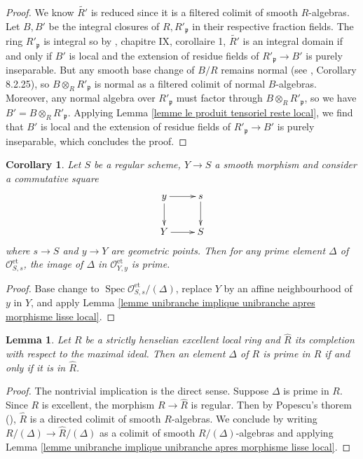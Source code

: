\documentclass[a4paper,10pt,twoside]{article}
\newcommand{\ra}{\rightarrow}
\newcommand{\on}[1]{\operatorname{#1}}
\renewcommand{\O}{\mathcal{O}}
\newcommand{\p}{\mathfrak{p}}
\DeclareMathOperator{\spec}{Spec}
\newtheorem{lem}[thm]{Lemma}
\newtheorem{cor}[thm]{Corollary}
\theoremstyle{definition}
\theoremstyle{remark}
\renewcommand{\on}[1]{\operatorname{#1}}
\begin{document}
\begin{proof}
We know $\tilde{R'}$ is reduced since it is a filtered colimit of smooth $R$-algebras. Let $B,B'$ be the integral closures of $R,R'_\p$ in their respective fraction fields. The ring $R'_\p$ is integral so by \cite{Raynaud}, chapitre IX, corollaire 1, $\tilde{R'}$ is an integral domain if and only if $B'$ is local and the extension of residue fields of $R'_\p\ra B'$ is purely inseparable. But any smooth base change of $B/R$ remains normal (see \cite{Liu}, Corollary 8.2.25), so $B\otimes_R R'_\p$ is normal as a filtered colimit of normal $B$-algebras. Moreover, any normal algebra over $R'_\p$ must factor through $B\otimes_R R'_\p$, so we have $B'=B\otimes_R R'_\p$. Applying Lemma \ref{lemme le produit tensoriel reste local}, we find that $B'$ is local and the extension of residue fields of $R'_\p\ra B'$ is purely inseparable, which concludes the proof.
\end{proof}

\begin{cor}\label{corollary:irred_of_etale_loc_ring_stable_under_smooth_maps}
Let $S$ be a regular scheme, $Y\to S$ a smooth morphism and consider a commutative square
\[
\xymatrix{
y \ar[r]\ar[d] 	& s \ar[d] \\
Y \ar[r]		& S
}
\]
where $s \to S$ and $y \to Y$ are geometric points. Then for any prime element $\Delta$ of $\O_{S,s}^{\on{et}}$, the image of $\Delta$ in $\O_{Y,y}^{\on{et}}$ is prime.
\end{cor}

\begin{proof}
Base change to $\spec\O_{S,s}^{\on{et}}/(\Delta)$, replace $Y$ by an affine neighbourhood of $y$ in $Y$, and apply Lemma \ref{lemme unibranche implique unibranche apres morphisme lisse local}.
\end{proof}

\begin{lem}\label{lemme les irreductibles au complete sont les irreductibles}
	Let $R$ be a strictly henselian excellent local ring and $\widehat{R}$ its completion with respect to the maximal ideal. Then an element $\Delta$ of $R$ is prime in $R$ if and only if it is in $\widehat{R}$.
\end{lem}

\begin{proof}
The nontrivial implication is the direct sense. Suppose $\Delta$ is prime in $R$. Since $R$ is excellent, the morphism $R\ra \widehat{R}$ is regular. Then by  Popescu's thorem (\cite[\href{http://stacks.math.columbia.edu/tag/07GB}{Tag 07GB}]{stacks-project}), $\widehat{R}$ is a directed colimit of smooth $R$-algebras. We conclude by writing $R/(\Delta) \to \widehat{R}/(\Delta)$ as a colimit of smooth $R/(\Delta)$-algebras and applying Lemma \ref{lemme unibranche implique unibranche apres morphisme lisse local}.
\end{proof}
\end{document}
